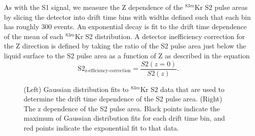 \documentclass[a4paper,12pt]{article}
\begin{document}
{As with the S1 signal, we measure the Z dependence of the $^{83m}$Kr S2 pulse areas by slicing the detector into drift time bins with widths defined such that each bin has roughly 300 events. 
An exponential decay is fit to the drift time dependence of the mean of each $^{83m}$Kr S2 distribution.  A detector inefficiency correction for the Z direction is defined by taking the ratio of the S2  pulse area just below the liquid surface to the S2 pulse area as a function of Z as described in the equation
\begin{equation}
\mbox{S}2_{\mbox{z-efficiency-correction}} = \frac{S2(z=0)}{S2(z)}.
\end{equation} 

\begin{figure} 
\centering
{}
\qquad
{}
\caption{ (Left) Gaussian distribution fits to $^{83m}$Kr S2 data that are used to determine the drift time dependence of the S2 pulse area. (Right) The z dependence of the S2 pulse area. Black points indicate the maximum of Gaussian distribution fits for each drift time bin, and red points indicate the exponential fit to that data.}
\label{fig:KrypCal_S2ZDep}
\end{figure}

}
\end{document}
